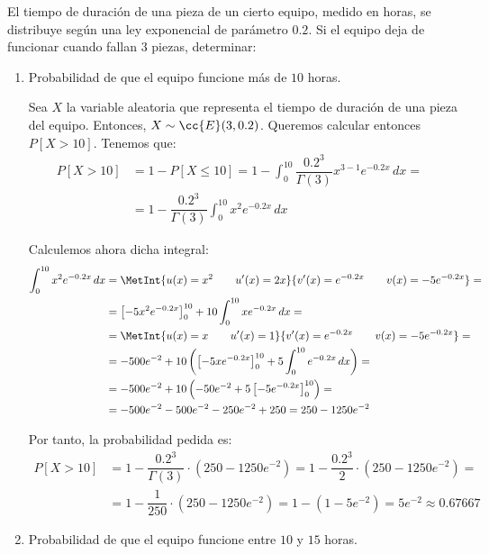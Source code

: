 \begin{ejercicio}
    El tiempo de duración de una pieza de un cierto equipo, medido en horas, se distribuye según una ley exponencial de parámetro $0.2$. 
    Si el equipo deja de funcionar cuando fallan $3$ piezas, determinar:
    \begin{enumerate}
        \item Probabilidad de que el equipo funcione más de $10$ horas.
        
        Sea $X$ la variable aleatoria que representa el tiempo de duración de una pieza del equipo. Entonces, $X\sim \cc{E}(3,0.2)$.
        Queremos calcular entonces $P[X>10]$. Tenemos que:
        \begin{align*}
            P[X>10] &= 1-P[X\leq 10] = 1-\int_{0}^{10} \dfrac{0.2^3}{\Gamma(3)} x^{3-1} e^{-0.2x} \, dx =&\\&= 1-\dfrac{0.2^3}{\Gamma(3)} \int_{0}^{10}x^2 e^{-0.2x} \, dx
        \end{align*}
        
        Calculemos ahora dicha integral:
        \begin{align*}
            \int_{0}^{10}x^2 e^{-0.2x} \, dx &= 
            \MetInt{u(x)=x^2\qquad u'(x)=2x}{v'(x)=e^{-0.2x}\qquad v(x)=-5e^{-0.2x}} =\\&=            
            \left[-5x^2e^{-0.2x}\right]_{0}^{10} + 10\int_{0}^{10}x e^{-0.2x} \, dx =\\&=
            \MetInt{u(x)=x\qquad u'(x)=1}{v'(x)=e^{-0.2x}\qquad v(x)=-5e^{-0.2x}} =\\&=
            -500e^{-2} + 10\left(\left[-5xe^{-0.2x}\right]_{0}^{10} + 5\int_{0}^{10}e^{-0.2x} \, dx\right) =\\&=
            -500e^{-2} + 10\left(-50e^{-2} + 5\left[-5e^{-0.2x}\right]_{0}^{10}\right) =\\&=
            -500e^{-2} - 500e^{-2} - 250e^{-2}+250 = 250-1250e^{-2}
        \end{align*}

        Por tanto, la probabilidad pedida es:
        \begin{align*}
            P[X>10] &= 1-\dfrac{0.2^3}{\Gamma(3)} \cdot (250-1250e^{-2}) = 1-\dfrac{0.2^3}{2} \cdot (250-1250e^{-2}) =\\&= 1-\dfrac{1}{250}\cdot (250-1250e^{-2}) = 1-(1-5e^{-2}) = 5e^{-2} \approx 0.67667
        \end{align*}
        \item Probabilidad de que el equipo funcione entre $10$ y $15$ horas.
        

\end{enumerate}
\end{ejercicio}

